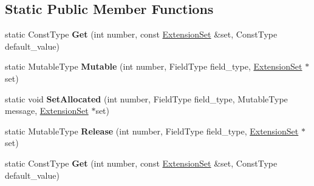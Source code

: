 \subsection*{Static Public Member Functions}
\begin{DoxyCompactItemize}
\item 
\mbox{\label{classgoogle_1_1protobuf_1_1internal_1_1MessageTypeTraits_a18cbefb86fa460586b4671ff32c23bf0}} 
static Const\+Type {\bfseries Get} (int number, const \hyperlink{classgoogle_1_1protobuf_1_1internal_1_1ExtensionSet}{Extension\+Set} \&set, Const\+Type default\+\_\+value)
\item 
\mbox{\label{classgoogle_1_1protobuf_1_1internal_1_1MessageTypeTraits_a4944921ca5e75cc69e8e09f4b3c1eb68}} 
static Mutable\+Type {\bfseries Mutable} (int number, Field\+Type field\+\_\+type, \hyperlink{classgoogle_1_1protobuf_1_1internal_1_1ExtensionSet}{Extension\+Set} $\ast$set)
\item 
\mbox{\label{classgoogle_1_1protobuf_1_1internal_1_1MessageTypeTraits_a4f763f4756953da44aed8228d705f0e4}} 
static void {\bfseries Set\+Allocated} (int number, Field\+Type field\+\_\+type, Mutable\+Type message, \hyperlink{classgoogle_1_1protobuf_1_1internal_1_1ExtensionSet}{Extension\+Set} $\ast$set)
\item 
\mbox{\label{classgoogle_1_1protobuf_1_1internal_1_1MessageTypeTraits_a2f7624a77c06c545fbc323fd88018e95}} 
static Mutable\+Type {\bfseries Release} (int number, Field\+Type field\+\_\+type, \hyperlink{classgoogle_1_1protobuf_1_1internal_1_1ExtensionSet}{Extension\+Set} $\ast$set)
\item 
\mbox{\label{classgoogle_1_1protobuf_1_1internal_1_1MessageTypeTraits_a18cbefb86fa460586b4671ff32c23bf0}} 
static Const\+Type {\bfseries Get} (int number, const \hyperlink{classgoogle_1_1protobuf_1_1internal_1_1ExtensionSet}{Extension\+Set} \&set, Const\+Type default\+\_\+value)
\item 
\mbox{\label{classgoogle_1_1protobuf_1_1internal_1_1MessageTypeTraits_a4944921ca5e75cc69e8e09f4b3c1eb68}} 

\end{DoxyCompactItemize}
